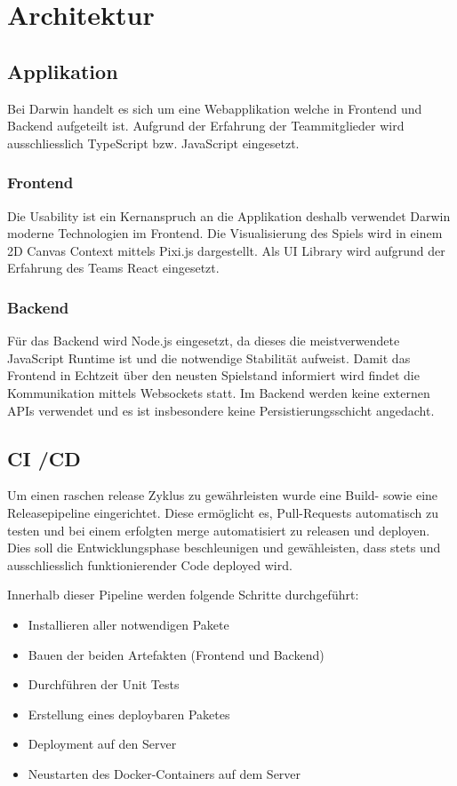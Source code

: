 \documentclass[a4paper, 11pt]{scrartcl}
\let\oldsection\section
\renewcommand\section{\clearpage\oldsection}
\begin{document}
\section{Architektur}
\subsection{Applikation}
Bei Darwin handelt es sich um eine Webapplikation welche in Frontend und Backend aufgeteilt ist.
Aufgrund der Erfahrung der Teammitglieder wird ausschliesslich TypeScript bzw. JavaScript eingesetzt.

\subsubsection{Frontend}
Die Usability ist ein Kernanspruch an die Applikation deshalb verwendet Darwin moderne Technologien im Frontend.
Die Visualisierung des Spiels wird in einem 2D Canvas Context mittels Pixi.js dargestellt.
Als UI Library wird aufgrund der Erfahrung des Teams React eingesetzt.

\subsubsection{Backend}
Für das Backend wird Node.js eingesetzt, da dieses die meistverwendete JavaScript Runtime ist und die notwendige Stabilität aufweist.
Damit das Frontend in Echtzeit über den neusten Spielstand informiert wird findet die Kommunikation mittels Websockets statt.
Im Backend werden keine externen APIs verwendet und es ist insbesondere keine Persistierungsschicht angedacht.

\subsection{CI /CD}
Um einen raschen release Zyklus zu gewährleisten wurde eine Build- sowie eine Releasepipeline eingerichtet.
Diese ermöglicht es, Pull-Requests automatisch zu testen und bei einem erfolgten merge automatisiert zu releasen und deployen.
Dies soll die Entwicklungsphase beschleunigen und gewähleisten, dass stets und ausschliesslich funktionierender Code deployed wird.

Innerhalb dieser Pipeline werden folgende Schritte durchgeführt:
\begin{itemize}
  \item Installieren aller notwendigen Pakete
  \item Bauen der beiden Artefakten (Frontend und Backend)
  \item Durchführen der Unit Tests
  \item Erstellung eines deploybaren Paketes
  \item Deployment auf den Server
  \item Neustarten des Docker-Containers auf dem Server
\end{itemize}
\end{document}
